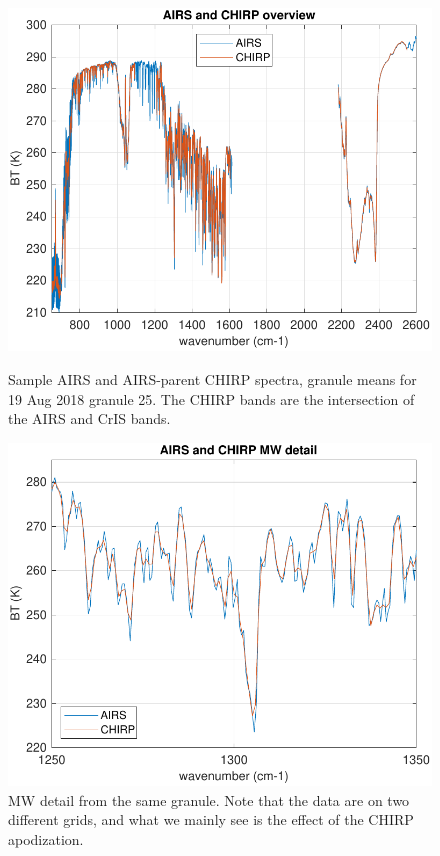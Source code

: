 \documentclass[11pt]{article}
\begin{document}
\begin{figure}
  \centering
  \begin{minipage}[t]{0.45\textwidth}
    \centering
    \includegraphics[width=\textwidth]{figures/airs_and_chirp_overview.pdf}
    \caption{Sample AIRS and AIRS-parent CHIRP spectra, granule means
      for 19 Aug 2018 granule 25.  The CHIRP bands are the intersection
      of the AIRS and CrIS bands.}
    \label{fig1}
  \end{minipage}\hfill
  \begin{minipage}[t]{0.45\textwidth}
    \centering
    \includegraphics[width=\textwidth]{figures/airs_and_chirp_mw_detail.pdf}
    \caption{MW detail from the same granule.  Note that the data
      are on two different grids, and what we mainly see is the
      effect of the CHIRP apodization.}
    \label{fig2}
  \end{minipage}
\end{figure}
\end{document}
